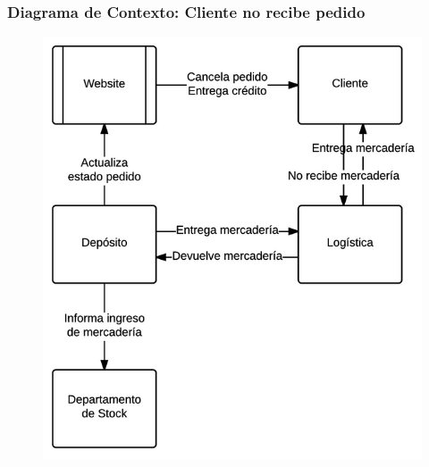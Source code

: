 \subsubsection{Diagrama de Contexto: Cliente no recibe pedido}
\begin{figure}[H]
  \includegraphics[width=\linewidth]{images/cliente-no-recibe-pedido.png}
\end{figure}

\clearpage
